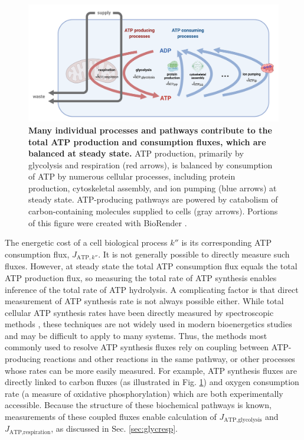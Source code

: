 \documentclass{compactarticle}
\begin{document}
\begin{figure}[!htpb]
    \centering
    \includegraphics[width=\textwidth]{fig/fig1.pdf}
    \caption{
        \textbf{Many individual processes and pathways contribute to the total ATP production and consumption fluxes, which are balanced at steady state.}
        ATP production, primarily by glycolysis and respiration (red arrows), is balanced by consumption of ATP by numerous cellular processes, including protein production, cytoskeletal assembly, and ion pumping (blue arrows) at steady state. ATP-producing pathways are powered by catabolism of carbon-containing molecules supplied to cells (gray arrows). Portions of this figure were created with BioRender \cite{biorender}.
    }
    \label{fig:overview}
\end{figure}

The energetic cost of a cell biological process $k''$ is its corresponding ATP consumption flux, $J_{\text{ATP},k''}$. It is not generally possible to directly measure such fluxes. However, at steady state the total ATP consumption flux equals the total ATP production flux, so measuring the total rate of ATP synthesis enables inference of the total rate of ATP hydrolysis. A complicating factor is that direct measurement of ATP synthesis rate is not always possible either. While total cellular ATP synthesis rates have been directly measured by spectroscopic methods \cite{brown197731p}, these techniques are not widely used in modern bioenergetics studies and may be difficult to apply to many systems. Thus, the methods most commonly used to resolve ATP synthesis fluxes rely on coupling between ATP-producing reactions and other reactions in the same pathway, or other processes whose rates can be more easily measured. For example, ATP synthesis fluxes are directly linked to carbon fluxes (as illustrated in Fig. \ref{fig:overview}) and oxygen consumption rate (a measure of oxidative phosphorylation) which are both experimentally accessible. Because the structure of these biochemical pathways is known, measurements of these coupled fluxes enable calculation of $ J_\text{ATP,glycolysis} $ and $ J_\text{ATP,respiration}$, as discussed in Sec. \ref{sec:glycresp}.
\end{document}
